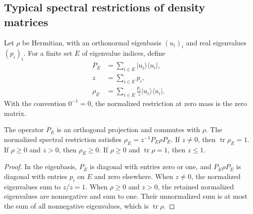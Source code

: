 \subsection{Typical spectral restrictions of density matrices}

\begin{definition}
\label{def:entropy_typical_density}
\leanok
Let $\rho$ be Hermitian, with an orthonormal eigenbasis $(u_i)_i$ and real
eigenvalues $(p_i)_i$. For a finite set $E$ of eigenvalue indices, define
\begin{align}
 P_E&=\sum_{i\in E}|u_i\rangle\langle u_i|,
 \label{eq:entropy_typical_projection}\\
 z&=\sum_{i\in E}p_i,
 \label{eq:entropy_typical_mass}\\
 \rho_E&=\sum_{i\in E}\frac{p_i}{z}|u_i\rangle\langle u_i|.
 \label{eq:entropy_typical_density}
\end{align}
With the convention $0^{-1}=0$, the normalized restriction at zero mass is the
zero matrix.
\end{definition}

\begin{theorem}
\label{thm:entropy_typical_density}
\leanok
{}
The operator $P_E$ is an orthogonal projection and commutes with $\rho$.
The normalized spectral restriction satisfies $\rho_E=z^{-1}P_E\rho P_E$.
If $z\ne0$, then $\operatorname{tr}\rho_E=1$.
If $\rho\ge0$ and $z>0$, then $\rho_E\ge0$.
If $\rho\ge0$ and $\operatorname{tr}\rho=1$, then $z\le1$.
\end{theorem}
\begin{proof}
\leanok
{}
In the eigenbasis, $P_E$ is diagonal with entries zero or one, and
$P_E\rho P_E$ is diagonal with entries $p_i$ on $E$ and zero elsewhere.
When $z\ne0$, the normalized eigenvalues sum to $z/z=1$.
When $\rho\ge0$ and $z>0$, the retained normalized eigenvalues are nonnegative
and sum to one. Their unnormalized sum is at most the sum of all nonnegative
eigenvalues, which is
$\operatorname{tr}\rho$.
\end{proof}

